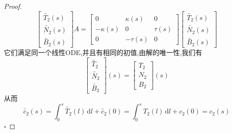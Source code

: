 \documentclass[../../古典微分几何.tex]{subfiles}
\begin{document}
\begin{proof}
\[\begin{bmatrix}
        \tilde{T_2}\left( s \right)\\ 
         \tilde{N_2}\left( s \right)\\ 
          \tilde{B_2}\left( s \right)    
    \end{bmatrix}A =  \begin{bmatrix} 
        0&  \kappa \left( s \right)&0\\ 
         - \kappa \left( s \right)&0&\tau \left( s \right)\\ 
          0&-\tau \left( s \right)&0     
    \end{bmatrix} \begin{bmatrix} 
        \tilde{T_2}\left( s \right)\\ 
         \tilde{N_2}\left( s \right)\\ 
          \tilde{B_2}\left( s \right)    
    \end{bmatrix}    
    \]它们满足同一个线性ODE,并且有相同的初值,由解的唯一性,我们有 \[
    \begin{bmatrix} 
        \tilde{T_2}\\ 
         \tilde{N_2}\\ 
          \tilde{B_2} 
    \end{bmatrix}\left( s \right)=  \begin{bmatrix} 
        T_2\\ 
         N_2\\ 
          B_2 
    \end{bmatrix}\left( s \right)    
    \]从而 \[
    \tilde{c_2}\left( s \right)=  \int_{0}^{s}\tilde{T_2}\left( l \right)\,\mathrm{d} l+ \tilde{c_2}\left( 0 \right)= \int_{0}^{s}T_2\left( l \right)\,\mathrm{d} l+  c_2\left( 0 \right)=  c_2\left( s \right)      
    \]
    \hfill $\square$
\end{proof}
\end{document}
